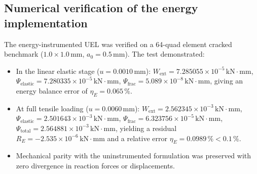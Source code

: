 \subsection{Numerical verification of the energy implementation}
The energy-instrumented UEL was verified on a 64-quad element cracked benchmark ($1.0\times1.0\,\mathrm{mm}$, $a_0=0.5\,\mathrm{mm}$). The test demonstrated:
\begin{itemize}
  \item In the linear elastic stage ($u=0.0010\,\mathrm{mm}$): $W_{\mathrm{ext}} = 7.285055\times10^{-5}\,\mathrm{kN\cdot mm}$, $\Psi_{\mathrm{elastic}} = 7.280335\times10^{-5}\,\mathrm{kN\cdot mm}$, $\Psi_{\mathrm{frac}} = 5.089\times10^{-8}\,\mathrm{kN\cdot mm}$, giving an energy balance error of $\eta_E = 0.065\,\%$.
  \item At full tensile loading ($u=0.0060\,\mathrm{mm}$): $W_{\mathrm{ext}} = 2.562345\times10^{-3}\,\mathrm{kN\cdot mm}$, $\Psi_{\mathrm{elastic}} = 2.501643\times10^{-3}\,\mathrm{kN\cdot mm}$, $\Psi_{\mathrm{frac}} = 6.323756\times10^{-5}\,\mathrm{kN\cdot mm}$, $\Psi_{\mathrm{total}} = 2.564881\times10^{-3}\,\mathrm{kN\cdot mm}$, yielding a residual $R_E = -2.535\times10^{-6}\,\mathrm{kN\cdot mm}$ and a relative error $\eta_E = 0.0989\,\% < 0.1\,\%$.
  \item Mechanical parity with the uninstrumented formulation was preserved with zero divergence in reaction forces or displacements.
\end{itemize}
